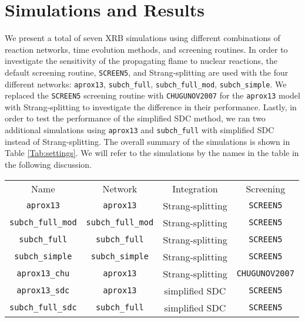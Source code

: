 \documentclass[preprint,times,tighten,linenumbers,trackchanges]{aastex631}
\begin{document}
\section{Simulations and Results}\label{Sec:results}

We present a total of seven XRB simulations using different combinations of reaction networks, time evolution methods, and screening routines. In order to investigate the sensitivity of the propagating flame to nuclear reactions, the default screening routine, {\tt SCREEN5}, and Strang-splitting are used with the four different networks: {\tt aprox13}, {\tt subch\_full}, {\tt subch\_full\_mod}, {\tt subch\_simple}. We replaced the {\tt SCREEN5} screening routine with {\tt CHUGUNOV2007} for the {\tt aprox13} model with Strang-splitting to investigate the difference in their performance. Lastly, in order to test the performance of the simplified SDC method, we ran two additional simulations using {\tt aprox13} and {\tt subch\_full} with simplified SDC instead of Strang-splitting. The overall summary of the simulations is shown in Table \ref{Tab:settings}.  We will
refer to the simulations by the names in the table
in the following discussion.


\begin{table*}
\caption{\label{Tab:settings}
Various settings used for each simulation.
}
\begin{ruledtabular}
\begin{tabular}{cccc}
Name &
Network &
Integration &
Screening
\\ 

\colrule

{\tt aprox13} & {\tt aprox13} & Strang-splitting & {\tt SCREEN5} \\
{\tt subch\_full\_mod} & {\tt subch\_full\_mod} & Strang-splitting & {\tt SCREEN5} \\
{\tt subch\_full} & {\tt subch\_full} & Strang-splitting & {\tt SCREEN5} \\
{\tt subch\_simple} & {\tt subch\_simple} & Strang-splitting & {\tt SCREEN5} \\
{\tt aprox13\_chu} & {\tt aprox13} & Strang-splitting & {\tt CHUGUNOV2007}\\
{\tt aprox13\_sdc} & {\tt aprox13} & simplified SDC & {\tt SCREEN5} \\
{\tt subch\_full\_sdc} & {\tt subch\_full} & simplified SDC & {\tt SCREEN5} \\


\end{tabular}
\end{ruledtabular}
\end{table*}
\end{document}
